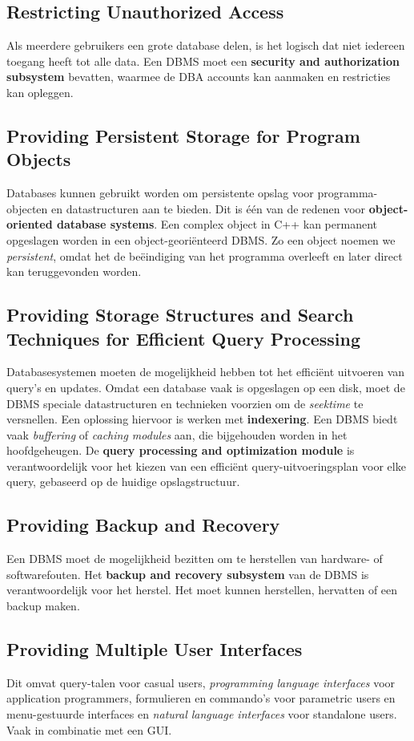 \subsection{Restricting Unauthorized Access}
Als meerdere gebruikers een grote database delen, is het logisch dat niet iedereen toegang heeft tot alle data. Een DBMS moet een \textbf{security and authorization subsystem} bevatten, waarmee de DBA accounts kan aanmaken en restricties kan opleggen. 

\subsection{Providing Persistent Storage for Program Objects}
Databases kunnen gebruikt worden om persistente opslag voor programma-objecten en datastructuren aan te bieden. Dit is \'e\'en van de redenen voor \textbf{object-oriented database systems}. Een complex object in C++ kan permanent opgeslagen worden in een object-geori\"enteerd DBMS. Zo een object noemen we \textit{persistent}, omdat het de be\"eindiging van het programma overleeft en later direct kan teruggevonden worden.

\subsection{Providing Storage Structures and Search Techniques for Efficient Query Processing}
Databasesystemen moeten de mogelijkheid hebben tot het effici\"ent uitvoeren van query's en updates. Omdat een database vaak is opgeslagen op een disk, moet de DBMS speciale datastructuren en technieken voorzien om de \textit{seektime} te versnellen. Een oplossing hiervoor is werken met \textbf{indexering}. Een DBMS biedt vaak \textit{buffering} of \textit{caching modules} aan, die bijgehouden worden in het hoofdgeheugen. De \textbf{query processing and optimization module} is verantwoordelijk voor het kiezen van een effici\"ent query-uitvoeringsplan voor elke query, gebaseerd op de huidige opslagstructuur.

\subsection{Providing Backup and Recovery}
Een DBMS moet de mogelijkheid bezitten om te herstellen van hardware- of softwarefouten. Het \textbf{backup and recovery subsystem} van de DBMS is verantwoordelijk voor het herstel. Het moet kunnen herstellen, hervatten of een backup maken.

\subsection{Providing Multiple User Interfaces}
Dit omvat query-talen voor casual users, \textit{programming language interfaces} voor application programmers, formulieren en commando's voor parametric users en menu-gestuurde interfaces en \textit{natural language interfaces} voor standalone users. Vaak in combinatie met een GUI.

